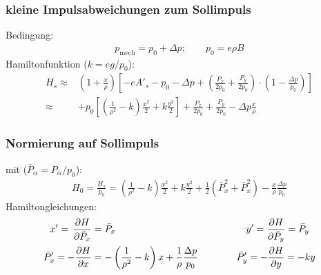 \documentclass[hyperref={pdfpagelabels=false}]{beamer}
\begin{document}
\begin{frame}
 \frametitle{kleine Impulsabweichungen zum Sollimpuls}
 \pause
 Bedingung:
 \begin{align*}
  p_\text{mech} = p_0 + \Delta p; \qquad p_0 = e\rho B
 \end{align*}
Hamiltonfunktion ($k = eg/p_0$):
\begin{align*}
 H_s \approx& \left(1+\frac{x}{\rho}\right)\left[-eA'_s-p_0-\Delta p + \left(\frac{P_x}{2p_0} + \frac{P_y}{2p_0}\right)\cdot \left(1-\frac{\Delta p}{p_0}\right)\right]\\
 \approx&  + p_0\left[\left(\frac{1}{\rho^2}-k\right)\frac{x^2}{2} + k\frac{y^2}{2}\right] +\frac{P_x}{2p_0} + \frac{P_y}{2p_0}-\Delta p\frac{x}{\rho}
\end{align*}

\end{frame}

\begin{frame}
 \frametitle{Normierung auf Sollimpuls}
 \pause
mit ($\bar{P}_\alpha = P_\alpha/p_0$):
\begin{align*}
 H_0 = \frac{H_s}{p_0} = \left(\frac{1}{\rho^2}-k\right)\frac{x^2}{2} + k\frac{y^2}{2} + \frac12(\bar{P}_x^2 + \bar{P}_x^2) - \frac{x}{\rho}\frac{\Delta p}{p_0}
\end{align*}
Hamiltongleichungen:
\begin{align*}
 x' = \,\frac{\partial H}{\partial \bar{P}_x} &= \bar{P}_x\hspace{4.75cm}  y' = \frac{\partial H}{\partial \bar{P}_y} = \bar{P}_y\\
 \bar{P}_x' = -\frac{\partial H}{\partial x} &= -\left(\frac{1}{\rho^2}-k\right)x +\frac{1}{\rho}\frac{\Delta p}{p_0} \hspace{1.4cm} \bar{P}_y' = -\frac{\partial H}{\partial y} = -ky
\end{align*}

 

 
\end{frame}
\end{document}
